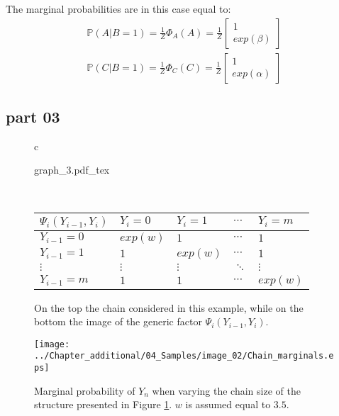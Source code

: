 The marginal probabilities are in this case equal to:
\begin{eqnarray}
\mathbb{P}(A | B = 1) = \frac{1}{Z}  \Phi_A(A) = \frac{1}{Z}  \begin{bmatrix} 1 \\ exp(\beta)  \end{bmatrix} \\
\mathbb{P}(C | B = 1) = \frac{1}{Z}  \Phi_C(C) = \frac{1}{Z}  \begin{bmatrix} 1 \\ exp(\alpha)  \end{bmatrix} 
\end{eqnarray}


\subsection{part 03}

\begin{figure}
\begin{tabular}{c}
\begin{minipage}[t]{0.8 \columnwidth}
	\centering
\def\svgwidth{0.9 \textwidth}
{graph_3.pdf_tex} 
\end{minipage} 
 \\ 
\begin{minipage}[t]{0.39 \columnwidth}
	\centering
\begin{tabular}{l|l|l|l|l|}
 $\Psi_i(Y_{i-1}, Y_i)$ & $Y_i = 0$ & $Y_i = 1$ & $\cdots$ & $Y_i = m$ \\
      \hline
$Y_{i-1} = 0$ 		  & $exp(w)$& $1$     & $\cdots$     & $1$     \\
\hline
$Y_{i-1} = 1$ 		  & $1$     & $exp(w)$& $\cdots$     & $1$    \\
\hline
$\vdots$ 		  		  & $\vdots$     & $\vdots$     & $\ddots$ & $\vdots$   \\
\hline
$Y_{i-1} = m$ 		  & $1$     & $1$     & $\cdots$ & $exp(w)$   \\
\hline 
\end{tabular}
\end{minipage} 
\end{tabular}
\caption{On the top the chain considered in this example, while on the bottom the image of the generic factor $\Psi_i(Y_{i-1}, Y_i)$.}
\label{fig:sample_02:5}
\end{figure}

\begin{figure}
	\centering
\texttt{[image: ../Chapter\_additional/04\_Samples/image\_02/Chain\_marginals.eps]}
\caption{Marginal probability of $Y_n$ when varying the chain size of the structure presented in Figure \ref{fig:sample_02:5}. $w$ is assumed equal to $3.5$.}
\label{fig:sample_02:6}
\end{figure} 


